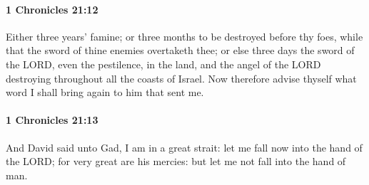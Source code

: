 		\paragraph{1 Chronicles 21:12} %
			\label{1CHRONICLES-21-12}

			Either three years’ famine; or three months to be destroyed before thy foes, while that the sword of thine enemies overtaketh thee; or else three days the sword of the LORD, even the pestilence, in the land, and the angel of the LORD destroying throughout all the coasts of Israel. Now therefore advise thyself what word I shall bring again to him that sent me.


		\paragraph{1 Chronicles 21:13} %
			\label{1CHRONICLES-21-13}

			And David said unto Gad, I am in a great strait: let me fall now into the hand of the LORD; for very great are his mercies: but let me not fall into the hand of man.

